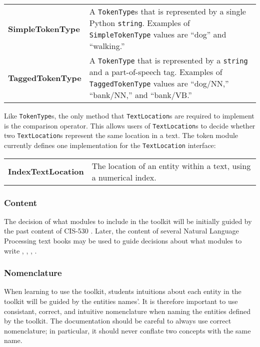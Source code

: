 \documentclass{article}
\begin{document}
\vspace{1.2mm}\noindent
\begin{tabular}{||p{}p{}}
  \textbf{SimpleTokenType} & A \texttt{TokenType}s that is
  represented by a single Python \texttt{string}.  Examples of
  \texttt{SimpleTokenType} values are ``dog'' and ``walking.'' \\

  \textbf{TaggedTokenType} & A \texttt{TokenType} that is
  represented by a \texttt{string} and a part-of-speech tag.  Examples 
  of \texttt{TaggedTokenType} values are ``dog/NN,'' ``bank/NN,'' and
  ``bank/VB.'' \\
\end{tabular}
\vspace{1mm}

Like \texttt{TokenType}s, the only method that \texttt{TextLocation}s
are required to implement is the comparison operator.  This allows
users of \texttt{TextLocation}s to decide whether two
\texttt{TextLocation}s represent the same location in a text.  The
token module currently defines one implementation for the
\texttt{TextLocation} interface:

\vspace{1.2mm}\noindent
\begin{tabular}{||p{}p{}}
  \textbf{IndexTextLocation} & The location of an
  entity within a text, using a numerical index. \\
\end{tabular}
\vspace{1mm}

\subsubsection{Content}

The decision of what modules to include in the toolkit will be
initially guided by the past content of CIS-530 \cite{cis530}.  Later,
the content of several Natural Language Processing text books may be
used to guide decisions about what modules to write \cite{allen1995},
\cite{gazdar1989}, \cite{jurafsky2000}, \cite{manning2000}.

\subsubsection{Nomenclature}

When learning to use the toolkit, students intuitions about each
entity in the toolkit will be guided by the entities names'.  It is
therefore important to use consistant, correct, and intuitive
nomenclature when naming the entities defined by the toolkit.
The documentation should be careful to always use correct
nomenclature; in particular, it should never conflate two concepts
with the same name.
\end{document}
